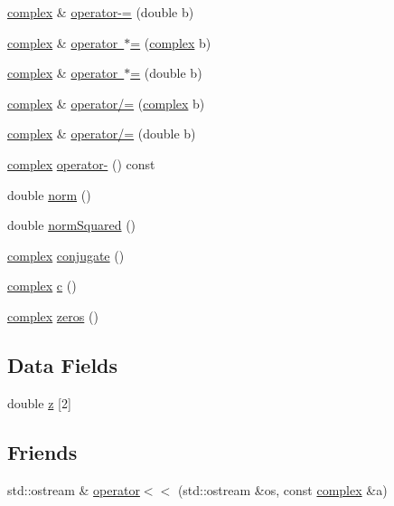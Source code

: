 \begin{DoxyCompactItemize}
\item 
\mbox{\hyperlink{classcomplex}{complex}} \& \mbox{\hyperlink{classcomplex_a91a1788c52422330b8785ac3dc87972f}{operator-\/=}} (double b)
\item 
\mbox{\hyperlink{classcomplex}{complex}} \& \mbox{\hyperlink{classcomplex_a1916e5817cf8faf91347120309e99e59}{operator $\ast$=}} (\mbox{\hyperlink{classcomplex}{complex}} b)
\item 
\mbox{\hyperlink{classcomplex}{complex}} \& \mbox{\hyperlink{classcomplex_addc9b5f5da847cd8c3c0e72401ab6513}{operator $\ast$=}} (double b)
\item 
\mbox{\hyperlink{classcomplex}{complex}} \& \mbox{\hyperlink{classcomplex_a2f33210a2ac9f91ad3f1f94958c52ee9}{operator/=}} (\mbox{\hyperlink{classcomplex}{complex}} b)
\item 
\mbox{\hyperlink{classcomplex}{complex}} \& \mbox{\hyperlink{classcomplex_ae519ff68a81b3c9944a3e3ec60bbe80f}{operator/=}} (double b)
\item 
\mbox{\hyperlink{classcomplex}{complex}} \mbox{\hyperlink{classcomplex_a969988c8e6c2a3af52c64e531471f6c0}{operator-\/}} () const
\item 
double \mbox{\hyperlink{classcomplex_a81dd00af9a4f56a86bd242b31cb1f8a4}{norm}} ()
\item 
double \mbox{\hyperlink{classcomplex_a5f69e50235222338ccd0e985de6b80d1}{norm\+Squared}} ()
\item 
\mbox{\hyperlink{classcomplex}{complex}} \mbox{\hyperlink{classcomplex_af21a3dae4577a3aab8e1105a1b919b81}{conjugate}} ()
\item 
\mbox{\hyperlink{classcomplex}{complex}} \mbox{\hyperlink{classcomplex_a4741546b5617d11e87ee7831067c84c5}{c}} ()
\item 
\mbox{\hyperlink{classcomplex}{complex}} \mbox{\hyperlink{classcomplex_ab1009ede7230f86df1a13f9c5c258ac7}{zeros}} ()
\end{DoxyCompactItemize}
\subsection*{Data Fields}
\begin{DoxyCompactItemize}
\item 
double \mbox{\hyperlink{classcomplex_a24187dbb902b927fe283d138188ec6fe}{z}} \mbox{[}2\mbox{]}
\end{DoxyCompactItemize}
\subsection*{Friends}
\begin{DoxyCompactItemize}
\item 
std\+::ostream \& \mbox{\hyperlink{classcomplex_aad6a59c1e6f7a869a693e1eba8b2604d}{operator$<$$<$}} (std\+::ostream \&os, const \mbox{\hyperlink{classcomplex}{complex}} \&a)
\end{DoxyCompactItemize}


